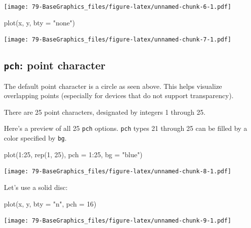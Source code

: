 \documentclass[
]{book}
\newenvironment{Shaded}{\begin{snugshade}}{\end{snugshade}}
\newcommand{\AttributeTok}[1]{\textcolor[rgb]{0.77,0.63,0.00}{#1}}
\newcommand{\DecValTok}[1]{\textcolor[rgb]{0.00,0.00,0.81}{#1}}
\newcommand{\FunctionTok}[1]{\textcolor[rgb]{0.00,0.00,0.00}{#1}}
\newcommand{\NormalTok}[1]{#1}
\newcommand{\SpecialCharTok}[1]{\textcolor[rgb]{0.00,0.00,0.00}{#1}}
\newcommand{\StringTok}[1]{\textcolor[rgb]{0.31,0.60,0.02}{#1}}
\begin{document}
\texttt{[image: 79-BaseGraphics\_files/figure-latex/unnamed-chunk-6-1.pdf]}

\begin{Shaded}
\begin{Highlighting}[]
\FunctionTok{plot}\NormalTok{(x, y, }\AttributeTok{bty =} \StringTok{"none"}\NormalTok{)}
\end{Highlighting}
\end{Shaded}

\texttt{[image: 79-BaseGraphics\_files/figure-latex/unnamed-chunk-7-1.pdf]}

\hypertarget{pch-point-character}{%
\subsection{\texorpdfstring{\textbf{\texttt{pch}}: point character}{pch: point character}}\label{pch-point-character}}

The default point character is a circle as seen above. This helps visualize overlapping points (especially for devices that do not support transparency).

There are 25 point characters, designated by integers 1 through 25.

Here's a preview of all 25 \texttt{pch} options.
\texttt{pch} types 21 through 25 can be filled by a color specified by \texttt{bg}.

\begin{Shaded}
\begin{Highlighting}[]
\FunctionTok{plot}\NormalTok{(}\DecValTok{1}\SpecialCharTok{:}\DecValTok{25}\NormalTok{, }\FunctionTok{rep}\NormalTok{(}\DecValTok{1}\NormalTok{, }\DecValTok{25}\NormalTok{), }\AttributeTok{pch =} \DecValTok{1}\SpecialCharTok{:}\DecValTok{25}\NormalTok{, }\AttributeTok{bg =} \StringTok{"blue"}\NormalTok{)}
\end{Highlighting}
\end{Shaded}

\texttt{[image: 79-BaseGraphics\_files/figure-latex/unnamed-chunk-8-1.pdf]}

Let's use a solid disc:

\begin{Shaded}
\begin{Highlighting}[]
\FunctionTok{plot}\NormalTok{(x, y, }\AttributeTok{bty =} \StringTok{"n"}\NormalTok{, }\AttributeTok{pch =} \DecValTok{16}\NormalTok{)}
\end{Highlighting}
\end{Shaded}

\texttt{[image: 79-BaseGraphics\_files/figure-latex/unnamed-chunk-9-1.pdf]}
\end{document}
